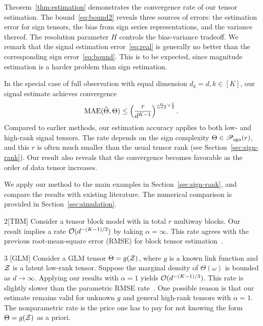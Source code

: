 \documentclass[11pt]{article}
\theoremstyle{plain}
\theoremstyle{definition}
\def\caliP{\mathscr{P}_{\textup{sgn}}}
\begin{document}
Theorem~\ref{thm:estimation} demonstrates the convergence rate of our tensor estimation. The bound~\eqref{eq:bound2} reveals three sources of errors: the estimation error for sign tensors, the bias from sign series representations, and the variance thereof. The resolution parameter $H$ controls the bias-variance tradeoff. We remark that the signal estimation error~\eqref{eq:real} is generally no better than the corresponding sign error~\eqref{eq:bound}. This is to be expected, since magnitude estimation is  a harder problem than sign estimation. 

In the special case of full observation with equal dimension $d_k=d, k\in[K]$, our signal estimate achieves convergence
\begin{equation}
\textup{MAE}(\hat \Theta, \Theta)\leq \left(r\over d^{K-1}\right)^{{\alpha \over \alpha+2} \vee {1\over 2}}.
\end{equation}
Compared to earlier methods, our estimation accuracy applies to both low- and high-rank signal tensors. The rate depends on the sign complexity $\Theta\in\caliP(r)$, and this $r$ is often much smaller than the usual tensor rank (see Section~\ref{sec:sign-rank}). Our result also reveals that the convergence becomes favorable as the order of data tensor increases. 

We apply our method to the main examples in Section~\ref{sec:sign-rank}, and compare the results with existing literature. The numerical comparison is provided in Section~\ref{sec:simulation}. \\

\begin{customexample}{2}[TBM]
Consider a tensor block model with in total $r$ multiway blocks. Our result implies a rate $\mathcal{O}(d^{-(K-1)/2})$ by taking $\alpha=\infty$. This rate agrees with the  previous root-mean-square error (RMSE) for block tensor estimation~\citep{wang2019multiway}.\\
\end{customexample}

\begin{customexample}{3} [GLM] 
Consider a GLM tensor $\Theta=g(\mathcal{Z})$, where $g$ is a known link function and $\mathcal{Z}$ is a latent low-rank tensor. Suppose the marginal density of $\Theta(\omega)$ is bounded as $d\to\infty$. Applying our results with $\alpha=1$ yields $\mathcal{O}(d^{-(K-1)/3})$. This rate is slightly slower than the parametric RMSE rate~\citep{zhang2018tensor,wang2018learning}. One possible reason is that our estimate remains valid for unknown $g$ and general high-rank tensors with $\alpha=1$. The nonparametric rate is the price one has to pay for not knowing the form $\Theta=g(\mathcal{Z})$ as a priori. 
\end{customexample}
\end{document}
